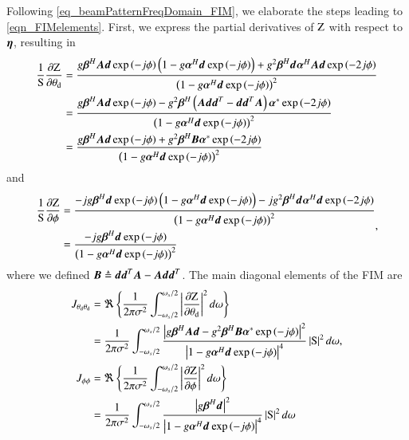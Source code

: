 Following \eqref{eq_beamPatternFreqDomain_FIM}, we elaborate the steps leading to \eqref{eqn_FIMelements}. First, we express the partial derivatives of $\F{z}$ with respect to $\boldsymbol{\eta}$, resulting in
\begin{equation*}
    {
        \begin{split}
            \frac{1}{\F{s}}\frac{\partial{\F{z}}}{\partial{\thetaD}} &= 
            \frac{
            g\vBetaH{}\vecnot{A}\vd\ePhi{-}\rBrace{1-g\aHd\ePhi{-}}+g^{2}\bHd\vAlphaH{}\vecnot{A}\vd\ePhi{-2}
            }{
            \rBrace{1-g\aHd\ePhi{-}}^{2}
            }
            \\&=
            \frac{
            g\vBetaH{}\vecnot{A}\vd\ePhi{-}-g^{2}\vBetaH{}\rBrace{\vecnot{A}\vd\vdT-\vd\vdT{}\vecnot{A}}\vAlphaC\ePhi{-2}
            }{
            \rBrace{1-g\aHd\ePhi{-}}^{2}
            }
            \\&=
            \frac{
            g\vBetaH{}\vecnot{A}\vd\ePhi{-}+g^{2}\vBetaH{}\vecnot{B}\vAlphaC\ePhi{-2}
            }{
            \rBrace{1-g\aHd\ePhi{-}}^{2}
            }
        \end{split}
    }
\end{equation*}
and
\begin{equation*}
    {
        \begin{split}
            \frac{1}{\F{s}}\frac{\partial{\F{z}}}{\partial{\phi}} &= 
            \frac{
            -jg\bHd\ePhi{-}\rBrace{1-g\aHd\ePhi{-}}-jg^{2}\bHd\aHd\ePhi{-2}
            }{
            \rBrace{1-g\aHd\ePhi{-}}^{2}
            }
            \\&=
            \frac{
            -jg\bHd\ePhi{-}
            }{
            \rBrace{1-g\aHd\ePhi{-}}^{2}
            }
        \end{split}
    },
\end{equation*}
where we defined $\boldsymbol{B}\triangleq\boldsymbol{d}\boldsymbol{d}^{T}{}\boldsymbol{A}-\boldsymbol{A}\boldsymbol{d}\boldsymbol{d}^{T}$. 
The main diagonal elements of the FIM are 
\begin{equation*}
    {
        \begin{split}
            J_{\thetaD\thetaD} &= \Re\cBrace{\frac{1}{2\pi\sigma^{2}}\int_{-\omega_{s}/2}^{\omega_{s}/2}\lBrace{\frac{\partial{\F{z}}}{\partial{\thetaD}}}^{2}d\omega}
            \\&=
            \frac{1}{2\pi\sigma^{2}}\int_{-\omega_{s}/2}^{\omega_{s}/2}{\frac{
            \lBrace{g\vBetaH{}\vecnot{A}\vd-g^{2}\vBetaH{}\vecnot{B}\vAlphaC\ePhi{-}}^{2}
            }{
            \lBrace{1-g\aHd\ePhi{-}}^{4}
            }\lBrace{\F{s}}^{2}d\omega},
            \\
            J_{\phi\phi} &= \Re\cBrace{\frac{1}{2\pi\sigma^{2}}\int_{-\omega_{s}/2}^{\omega_{s}/2}\lBrace{\frac{\partial{\F{z}}}{\partial{\phi}}}^{2}d\omega}
            \\&=
            \frac{1}{2\pi\sigma^{2}}\int_{-\omega_{s}/2}^{\omega_{s}/2}{\frac{
            \lBrace{g\bHd}^{2}
            }{
            \lBrace{1-g\aHd\ePhi{-}}^{4}
            }\lBrace{\F{s}}^{2}d\omega}
        \end{split}
    }
\end{equation*}
